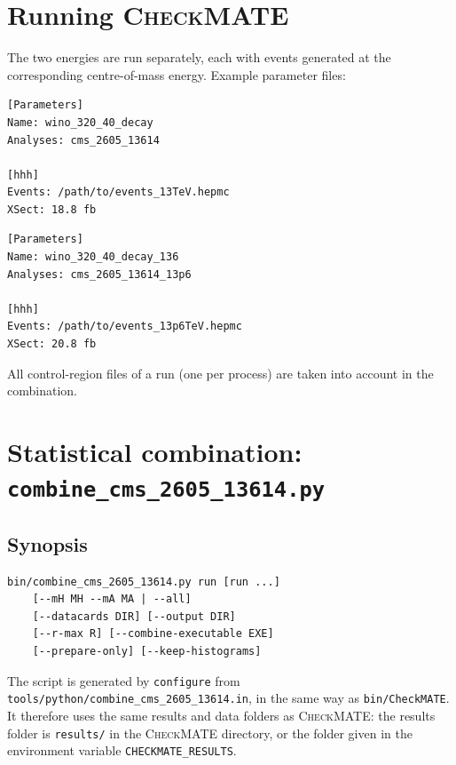 \documentclass[11pt,a4paper]{article}
\newcommand{\cm}{\textsc{CheckMATE}}
\newcommand{\file}[1]{\texttt{#1}}
\begin{document}
\section{Running \cm{}}

The two energies are run separately, each with events generated at the
corresponding centre-of-mass energy. Example parameter files:

\begin{lstlisting}
[Parameters]
Name: wino_320_40_decay
Analyses: cms_2605_13614

[hhh]
Events: /path/to/events_13TeV.hepmc
XSect: 18.8 fb
\end{lstlisting}

\begin{lstlisting}
[Parameters]
Name: wino_320_40_decay_136
Analyses: cms_2605_13614_13p6

[hhh]
Events: /path/to/events_13p6TeV.hepmc
XSect: 20.8 fb
\end{lstlisting}

All control-region files of a run (one per process) are taken into account
in the combination.

\section{Statistical combination: \file{combine\_cms\_2605\_13614.py}}

\subsection{Synopsis}

\begin{lstlisting}
bin/combine_cms_2605_13614.py run [run ...]
    [--mH MH --mA MA | --all]
    [--datacards DIR] [--output DIR]
    [--r-max R] [--combine-executable EXE]
    [--prepare-only] [--keep-histograms]
\end{lstlisting}

The script is generated by \texttt{configure} from
\file{tools/python/combine\_cms\_2605\_13614.in}, in the same way as
\file{bin/CheckMATE}. It therefore uses the same results and data folders as
\cm{}: the results folder is \file{results/} in the \cm{} directory, or the
folder given in the environment variable \texttt{CHECKMATE\_RESULTS}.
\end{document}
